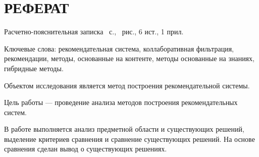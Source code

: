 \chapter*{РЕФЕРАТ}

Расчетно-пояснительная записка~\pageref{LastPage} с., \totalfigures\ рис., 6 ист., 1 прил.

Ключевые слова: рекомендательная система, коллаборативная фильтрация, рекомендации, методы, основанные на контенте,
методы основанные на знаниях, гибридные методы.

Объектом исследования является метод построения рекомендательной системы.

Цель работы --- проведение анализа методов построения рекомендательных систем.

В работе выполняется анализ предметной области и существующих решений, выделение критериев сравнения и сравнение существующих решений.
На основе сравнения сделан вывод о существующих решениях.